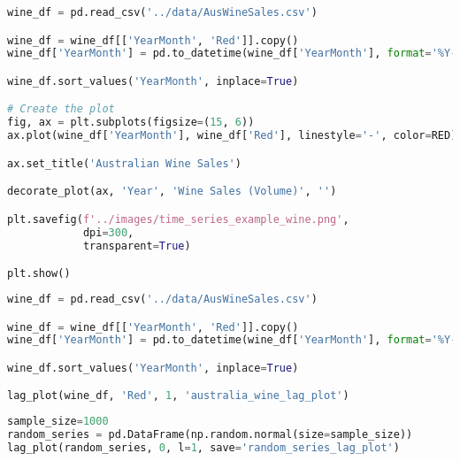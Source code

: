 \begin{center}
  \begin{lstlisting}[language=Python, 
  caption={Месячный объём продаж красного вина в Австралии.}, 
  label={lst:time_series_example_wine}]
wine_df = pd.read_csv('../data/AusWineSales.csv')

wine_df = wine_df[['YearMonth', 'Red']].copy()
wine_df['YearMonth'] = pd.to_datetime(wine_df['YearMonth'], format='%Y-%m')

wine_df.sort_values('YearMonth', inplace=True)

# Create the plot
fig, ax = plt.subplots(figsize=(15, 6))
ax.plot(wine_df['YearMonth'], wine_df['Red'], linestyle='-', color=RED)

ax.set_title('Australian Wine Sales')

decorate_plot(ax, 'Year', 'Wine Sales (Volume)', '')

plt.savefig(f'../images/time_series_example_wine.png', 
            dpi=300, 
            transparent=True)

plt.show()
  \end{lstlisting}
\end{center}

\begin{center}
  \begin{lstlisting}[language=Python, 
  caption={График задержек продаж вина в Австралии.}, 
  label={lst:time_series_lag_plot_wine}]
wine_df = pd.read_csv('../data/AusWineSales.csv')

wine_df = wine_df[['YearMonth', 'Red']].copy()
wine_df['YearMonth'] = pd.to_datetime(wine_df['YearMonth'], format='%Y-%m')

wine_df.sort_values('YearMonth', inplace=True)

lag_plot(wine_df, 'Red', 1, 'australia_wine_lag_plot')
  \end{lstlisting}
\end{center}

\begin{center}
  \begin{lstlisting}[language=Python, 
  caption={График задержек белого шума.}, 
  label={lst:time_series_lag_plot_random}]
sample_size=1000
random_series = pd.DataFrame(np.random.normal(size=sample_size)) 
lag_plot(random_series, 0, l=1, save='random_series_lag_plot')
  \end{lstlisting}
\end{center}

